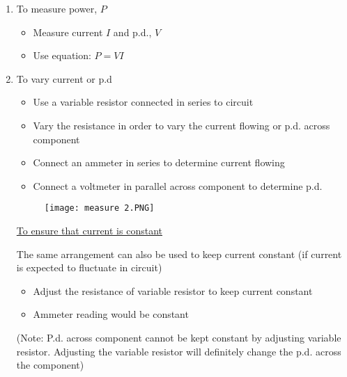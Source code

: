 \documentclass{article}
\begin{document}
\begin{enumerate}
\begin{itemize}
    \end{itemize}
    
    \item To measure power, $P$
    \begin{itemize}
        \item Measure current $I$ and p.d., $V$
        \item Use equation: $P=VI$
    \end{itemize}
    
    \item To vary current or p.d
    \begin{itemize}
        \item 	Use a variable resistor connected in series to circuit
\item 	Vary the resistance in order to vary the current flowing or p.d. across component
\item	Connect an ammeter in series to determine current flowing
\item Connect a voltmeter in parallel across component to determine p.d.

    \end{itemize}
    \begin{figure}[H]
        \centering
        \texttt{[image: measure 2.PNG]}
    \end{figure}


\underline{To ensure that current is constant}

The same arrangement can also be used to keep current constant (if current is expected to
fluctuate in circuit)
\begin{itemize}
    \item Adjust the resistance of variable resistor to keep current constant
\item Ammeter reading would be constant
\end{itemize}
(Note: P.d. across component cannot be kept constant by adjusting variable resistor.
Adjusting the variable resistor will definitely change the p.d. across the component)


\end{enumerate}
\end{document}
